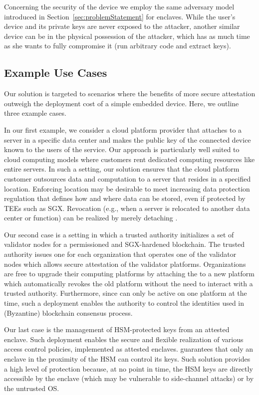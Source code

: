 Concerning the security of the \device device we employ the same adversary model introduced in Section~\ref{sec:problemStatement} for enclaves. While the user's device and its private keys are never exposed to the attacker, another similar device can be in the physical possession of the attacker, which has as much time as she wants to fully compromise it (run arbitrary code and extract keys). 


\subsection{Example Use Cases}
\label{sec:use-cases}

Our solution is targeted to scenarios where the benefits of more secure attestation outweigh the deployment cost of a simple embedded device. Here, we outline three example cases.  

 In our first example, we consider a cloud platform provider that attaches \device to a server in a specific data center and makes the public key of the connected device known to the users of the service. Our approach is particularly well suited to cloud computing models where customers rent dedicated computing resources like entire servers. In such a setting, our solution ensures that the cloud platform customer outsources data and computation to a server that resides in a specified location. Enforcing location may be desirable to meet increasing data protection regulation that defines how and where data can be stored, even if protected by TEEs such as SGX. Revocation (e.g., when a server is relocated to another data center or function) can be realized by merely detaching \device.

 Our second case is a setting in which a trusted authority initializes a set of validator nodes for a permissioned and SGX-hardened blockchain. 
The trusted authority issues one \device for each organization that operates one of the validator nodes which allows secure attestation of the validator platforms. Organizations are free to upgrade their computing platforms by attaching the \device to a new platform which automatically revokes the old platform without the need to interact with a trusted authority. Furthermore, since \device can only be active on one platform at the time, such a deployment enables the authority to control the identities used in (Byzantine) blockchain consensus process.



 Our last case is the management of HSM-protected keys from an attested enclave. Such deployment enables the secure and flexible realization of various access control policies, implemented as attested enclaves. \name guarantees that only an enclave in the proximity of the HSM can control its keys. Such solution provides a high level of protection because, at no point in time, the HSM keys are directly accessible by the enclave (which may be vulnerable to side-channel attacks) or by the untrusted OS.


